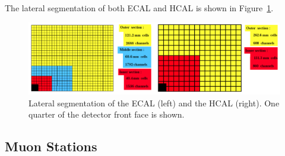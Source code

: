 The lateral segmentation of both ECAL and HCAL is shown in Figure~\ref{fig:cal_system}.
\begin{figure}
    \centering
    \includegraphics[width=\textwidth]{figures/CAL_system.png}
    \caption{Lateral segmentation of the ECAL (left) and the HCAL (right). One quarter of the detector front face is shown.}
    \label{fig:cal_system}
\end{figure}
\subsection{Muon Stations}

